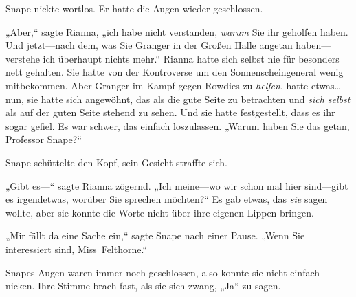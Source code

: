 Snape nickte wortlos. Er hatte die Augen wieder geschlossen.

„Aber,“ sagte Rianna, „ich habe nicht verstanden, \emph{warum} Sie ihr geholfen haben. Und jetzt—nach dem, was Sie Granger in der Großen Halle angetan haben—verstehe ich überhaupt nichts mehr.“ Rianna hatte sich selbst nie für besonders nett gehalten. Sie hatte von der Kontroverse um den Sonnenscheingeneral wenig mitbekommen. Aber Granger im Kampf gegen Rowdies zu \emph{helfen}, hatte etwas…nun, sie hatte sich angewöhnt, das als die gute Seite zu betrachten und \emph{sich selbst} als auf der guten Seite stehend zu sehen. Und sie hatte festgestellt, dass es ihr sogar gefiel. Es war schwer, das einfach loszulassen. „Warum haben Sie das getan, Professor Snape?“

Snape schüttelte den Kopf, sein Gesicht straffte sich.

„Gibt es—“ sagte Rianna zögernd. „Ich meine—wo wir schon mal hier sind—gibt es irgendetwas, worüber Sie sprechen möchten?“ Es gab etwas, das \emph{sie} sagen wollte, aber sie konnte die Worte nicht über ihre eigenen Lippen bringen.

„Mir fällt da eine Sache ein,“ sagte Snape nach einer Pause. „Wenn Sie interessiert sind, Miss~Felthorne.“

Snapes Augen waren immer noch geschlossen, also konnte sie nicht einfach nicken. Ihre Stimme brach fast, als sie sich zwang, „Ja“ zu sagen.

